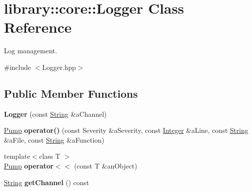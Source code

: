 \hypertarget{classlibrary_1_1core_1_1_logger}{}\section{library\+:\+:core\+:\+:Logger Class Reference}
\label{classlibrary_1_1core_1_1_logger}


Log management.  




{\ttfamily \#include $<$Logger.\+hpp$>$}

\subsection*{Public Member Functions}
\begin{DoxyCompactItemize}
\item 
\mbox{\label{classlibrary_1_1core_1_1_logger_a0bc89b6aca42f5c7f08df824be5a8f2b}} 
{\bfseries Logger} (const \hyperlink{classlibrary_1_1core_1_1types_1_1_string}{String} \&a\+Channel)
\item 
\mbox{\label{classlibrary_1_1core_1_1_logger_aca8b3f76a6c88286ff0521d2dccfc86e}} 
\hyperlink{classlibrary_1_1core_1_1logger_1_1_pump}{Pump} {\bfseries operator()} (const Severity \&a\+Severity, const \hyperlink{classlibrary_1_1core_1_1types_1_1_integer}{Integer} \&a\+Line, const \hyperlink{classlibrary_1_1core_1_1types_1_1_string}{String} \&a\+File, const \hyperlink{classlibrary_1_1core_1_1types_1_1_string}{String} \&a\+Function)
\item 
\mbox{\label{classlibrary_1_1core_1_1_logger_ae0bdb3a8d52dd8f7d359757d821ccfef}} 
{\footnotesize template$<$class T $>$ }\\\hyperlink{classlibrary_1_1core_1_1logger_1_1_pump}{Pump} {\bfseries operator$<$$<$} (const T \&an\+Object)
\item 
\mbox{\label{classlibrary_1_1core_1_1_logger_a61b860f2a6b4c54accdb04d7b15e3653}} 
\hyperlink{classlibrary_1_1core_1_1types_1_1_string}{String} {\bfseries get\+Channel} () const
\end{DoxyCompactItemize}
